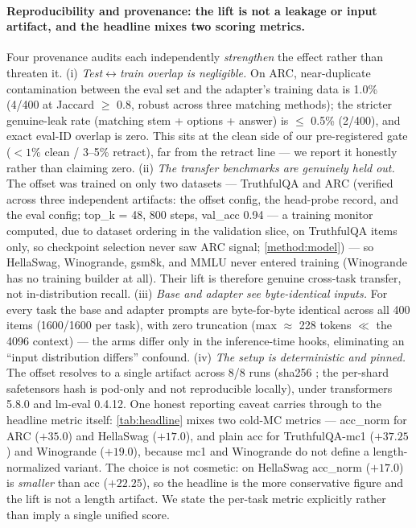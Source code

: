 \paragraph{Reproducibility and provenance: the lift is not a leakage or input
artifact, and the headline mixes two scoring metrics.}
Four provenance audits each independently \emph{strengthen} the effect rather than
threaten it. (i) \emph{Test${\leftrightarrow}$train overlap is negligible.} On ARC,
near-duplicate contamination between the eval set and the adapter's training data
is 1.0\% (4/400 at Jaccard ${\geq}$ 0.8, robust across three matching methods); the
stricter genuine-leak rate (matching stem + options + answer) is ${\leq}$ 0.5\%
(2/400), and exact eval-ID overlap is zero. This sits at the clean side of our
pre-registered gate ($<1\%$ clean / 3--5\% retract), far from the retract line ---
we report it honestly rather than claiming zero. (ii) \emph{The transfer benchmarks
are genuinely held out.} The offset was trained on only two datasets ---
TruthfulQA and ARC (verified across three independent artifacts: the offset config,
the head-probe record, and the eval config; top\_k = 48, 800 steps, val\_acc 0.94
--- a training monitor computed, due to dataset ordering in the validation slice,
on TruthfulQA items only, so checkpoint selection never saw ARC signal;
\cref{method:model}) --- so HellaSwag, Winogrande, gsm8k, and MMLU never entered
training (Winogrande has no training builder at all). Their lift is therefore
genuine cross-task transfer, not in-distribution recall. (iii) \emph{Base and
adapter see byte-identical inputs.} For every task the base and adapter prompts are
byte-for-byte identical across all 400 items (1600/1600 per task), with zero
truncation (max ${\approx}$ 228 tokens ${\ll}$ the 4096 context) --- the arms
differ only in the inference-time hooks, eliminating an ``input distribution
differs'' confound. (iv) \emph{The setup is deterministic and pinned.} The offset
resolves to a single artifact across 8/8 runs (sha256 ; the
per-shard safetensors hash is pod-only and not reproducible locally), under
transformers 5.8.0 and lm-eval 0.4.12. One honest reporting caveat carries through
to the headline metric itself: \cref{tab:headline} mixes two cold-MC metrics ---
acc\_norm for ARC ($+35.0$) and HellaSwag ($+17.0$), and plain acc for
TruthfulQA-mc1 ($+37.25$) and Winogrande ($+19.0$), because mc1 and Winogrande do
not define a length-normalized variant. The choice is not cosmetic: on HellaSwag
acc\_norm ($+17.0$) is \emph{smaller} than acc ($+22.25$), so the headline is the
more conservative figure and the lift is not a length artifact. We state the
per-task metric explicitly rather than imply a single unified score.
\label{lim:metric}

